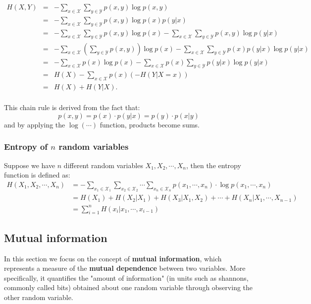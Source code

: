 \begin{itemize}
	\begin{equation*}
		\begin{array}{rcl}
			H(X, Y) & = & -\sum_{x \in \mathcal{X}} \sum_{y \in \mathcal{Y}} p(x,y) \log p(x,y)\\[8pt]
			& = & - \sum_{x \in \mathcal{X}} \sum_{y \in \mathcal{Y}} p(x,y) \log p(x)p(y|x)\\[8pt]
			& = & - \sum_{x \in \mathcal{X}} \sum_{y \in \mathcal{Y}} p(x,y) \log p(x) - \sum_{x \in \mathcal{X}} \sum_{y \in \mathcal{Y}} p(x,y)\log p(y|x)\\[8pt]
			& = & - \sum_{x \in \mathcal{X}} \left(\sum_{y \in \mathcal{Y}} p(x, y)\right) \log{p(x)} - \sum_{x \in \mathcal{X}} \sum_{y \in \mathcal{Y}} p(x)p(y|x) \log{p(y|x)}\\[8pt]
			& = & - \sum_{x \in \mathcal{X}} p(x) \log{p(x)} - \sum_{x \in \mathcal{X}} p(x) \sum_{y \in \mathcal{Y}} p(y|x) \log{p(y|x)}\\[8pt]
			& = & H(X) - \sum_{x \in \mathcal{X}} p(x) (-H(Y|X=x))\\[8pt]
			& = & H(X) + H(Y|X).\\
		\end{array}
	\end{equation*}

	This chain rule is derived from the fact that:
	$$p(x,y) = p(x) \cdot p(y|x) = p(y) \cdot p(x|y)$$
	and by applying the $\log(\cdots)$ function, products become sums. 
\end{itemize} 

\subsubsection{Entropy of $n$ random variables} 

Suppose we have $n$ different random variables $X_1, X_2, \cdots, X_n$, then the entropy function is defined as:
\begin{equation*}
\begin{split}
H(X_1, X_2, \cdots, X_n) &= -\sum_{x_1 \in \mathcal{X}_1} \sum_{x_2 \in \mathcal{X}_2} \cdots \sum_{x_n \in \mathcal{X}_n} p(x_1, \cdots, x_n) \cdot \log p(x_1, \cdots, x_n)\\
&=H(X_1) + H(X_2|X_1) + H(X_3| X_1, X_2) + \cdots + H(X_n | X_1, \cdots, X_{n-1})\\
&=\sum_{i=1}^n H(x_i| x_1, \cdots, x_{i-1})
\end{split}
\end{equation*}

\subsection{Mutual information}
In this section we focus on the concept of \textbf{mutual information}, which represents a measure of the \textbf{mutual dependence} between two variables. More specifically, it quantifies the "amount of information" (in units such as shannons, commonly called bits) obtained about one random variable through observing the other random variable.


